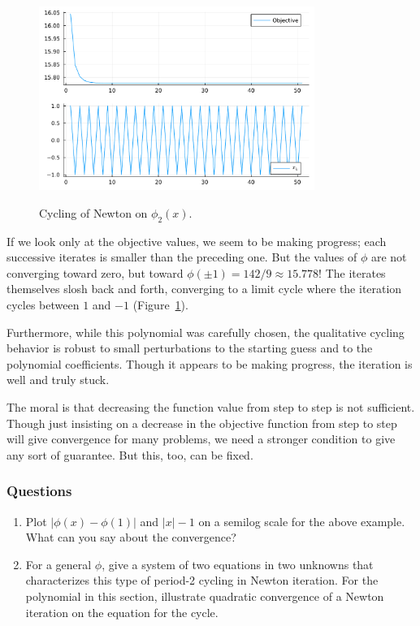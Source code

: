 \documentclass[12pt, leqno]{article} %
\providecommand{\tightlist}{%
  \setlength{\itemsep}{0pt}\setlength{\parskip}{0pt}}
\begin{document}
\begin{figure}
\begin{center}
  \includegraphics[width=0.8\textwidth]{fig/2023-04-17-phi2-newton.pdf} \\
\end{center}
\caption{Cycling of Newton on $\phi_2(x)$.}
\label{fig:phi2-newton}
\end{figure}

If we look only at the objective values, we seem to be making progress;
each successive iterates is smaller than the preceding one. But the
values of $\phi$ are not converging toward zero, but toward
$\phi(\pm 1) = 142/9 \approx 15.778$! The iterates themselves slosh back
and forth, converging to a limit cycle where the iteration cycles
between $1$ and $-1$ (Figure~\ref{fig:phi2-newton}).

Furthermore, while this polynomial was carefully chosen, the qualitative
cycling behavior is robust to small perturbations to the starting guess
and to the polynomial coefficients. Though it appears to be making
progress, the iteration is well and truly stuck.

The moral is that decreasing the function value from step to step is not
sufficient. Though just insisting on a decrease in the objective
function from step to step will give convergence for many problems, we
need a stronger condition to give any sort of guarantee. But this, too,
can be fixed.

\subsubsection{Questions}

\begin{enumerate}
\def\labelenumi{\arabic{enumi}.}
\tightlist
\item
  Plot \(|\phi(x)-\phi(1)|\) and \(|x|-1\) on a semilog scale for the
  above example. What can you say about the convergence?
\item
  For a general \(\phi\), give a system of two equations in two unknowns
  that characterizes this type of period-2 cycling in Newton iteration.
  For the polynomial in this section, illustrate quadratic convergence
  of a Newton iteration on the equation for the cycle.
\end{enumerate}
\end{document}
